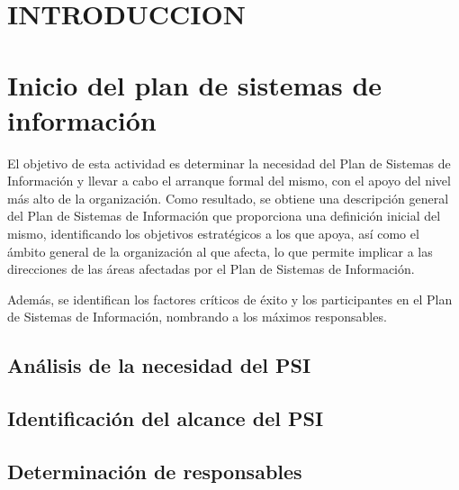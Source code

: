 \documentclass[12pt,a4paper,titlepage,spanish,twoside]{book}
\begin{document}
\section{INTRODUCCION}

\section{Inicio del plan de sistemas de información}
El objetivo de esta actividad es determinar la necesidad del Plan de Sistemas de
Información y llevar a cabo el arranque formal del mismo, con el apoyo del nivel
más alto de la organización. Como resultado, se obtiene una descripción general 
del Plan de Sistemas de Información que proporciona una definición inicial del 
mismo, identificando los objetivos estratégicos a los que apoya, así como el 
ámbito general de la organización al que afecta, lo que permite implicar a las 
direcciones de las áreas afectadas por el Plan de Sistemas de Información.

Además, se identifican los factores críticos de éxito y los participantes en el 
Plan de Sistemas de Información, nombrando a los máximos responsables.

\subsection{Análisis de la necesidad del PSI}
\subsection{Identificación del alcance del PSI}
\subsection{Determinación de responsables}
\end{document}
